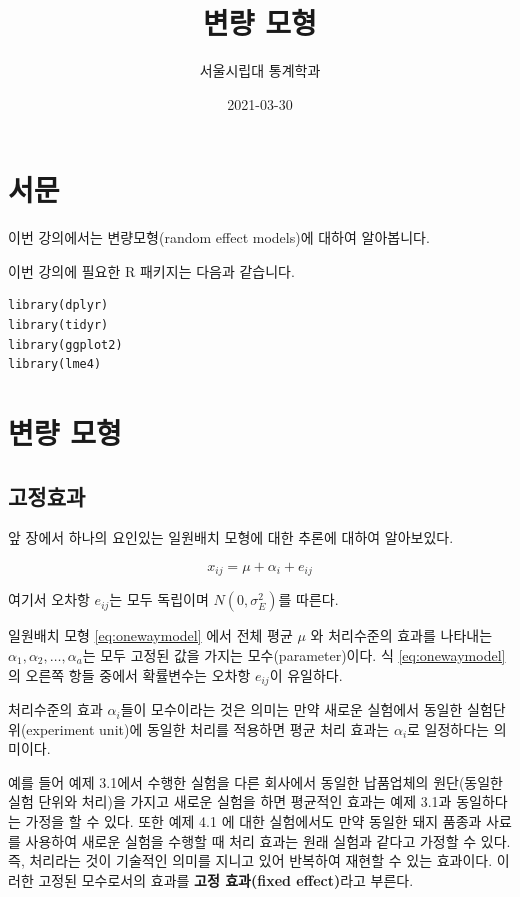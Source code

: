 \documentclass[
]{book}
\title{변량 모형}
\author{서울시립대 통계학과}
\date{2021-03-30}
\theoremstyle{definition}
\theoremstyle{definition}
\theoremstyle{definition}
\theoremstyle{remark}
\begin{document}
\maketitle

{
\setcounter{tocdepth}{1}
\tableofcontents
}
\hypertarget{uxc11cuxbb38}{%
\chapter*{서문}\label{uxc11cuxbb38}}


이번 강의에서는 변량모형(random effect models)에 대하여 알아봅니다.

이번 강의에 필요한 R 패키지는 다음과 같습니다.

\begin{verbatim}
library(dplyr)
library(tidyr)
library(ggplot2)
library(lme4)
\end{verbatim}

\mainmatter

\hypertarget{intro}{%
\chapter{변량 모형}\label{intro}}

\hypertarget{uxace0uxc815uxd6a8uxacfc}{%
\section{고정효과}\label{uxace0uxc815uxd6a8uxacfc}}

앞 장에서 하나의 요인있는 일원배치 모형에 대한 추론에 대하여 알아보있다.

\begin{equation}
x_{ij} = \mu + \alpha_i + e_{ij}
\label{eq:onewaymodel}
\end{equation}

여기서 오차항 \(e_{ij}\)는 모두 독립이며 \(N(0,\sigma_E^2)\)를 따른다.

일원배치 모형 \eqref{eq:onewaymodel} 에서 전체 평균 \(\mu\) 와 처리수준의 효과를 나타내는 \(\alpha_1, \alpha_2, \dots, \alpha_a\)는 모두 고정된 값을 가지는 모수(parameter)이다. 식 \eqref{eq:onewaymodel} 의 오른쪽 항들 중에서 확률변수는 오차항 \(e_{ij}\)이 유일하다.

처리수준의 효과 \(\alpha_i\)들이 모수이라는 것은 의미는 만약 새로운 실험에서 동일한 실험단위(experiment unit)에 동일한 처리를 적용하면 평균 처리 효과는 \(\alpha_i\)로 일정하다는 의미이다.

예를 들어 예제 3.1에서 수행한 실험을 다른 회사에서 동일한 납품업체의 원단(동일한 실험 단위와 처리)을 가지고 새로운 실험을 하면 평균적인 효과는 예제 3.1과 동일하다는 가정을 할 수 있다. 또한 예제 4.1 에 대한 실험에서도 만약 동일한 돼지 품종과 사료를 사용하여 새로운 실험을 수행할 때 처리 효과는 원래 실험과 같다고 가정할 수 있다. 즉, 처리라는 것이 기술적인 의미를 지니고 있어 반복하여 재현할 수 있는 효과이다. 이러한 고정된 모수로서의 효과를 \textbf{고정 효과(fixed effect)}라고 부른다.
\end{document}
